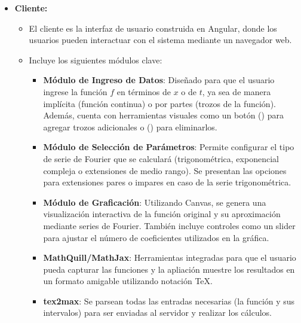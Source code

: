 \begin{itemize}
	\item \textbf{Cliente:}
	\begin{itemize}
		\item El cliente es la interfaz de usuario construida en Angular, donde los usuarios pueden interactuar con el sistema mediante un navegador web.
		\item Incluye los siguientes módulos clave:
		\begin{itemize}
			\item \textbf{Módulo de Ingreso de Datos}: Diseñado para que el usuario ingrese la función \( f \) en términos de $x$ o de $t$, ya sea de manera implícita (función continua) o por partes (trozos de la función). Además, cuenta con herramientas visuales como un botón () para agregar trozos adicionales o () para eliminarlos.
			\item \textbf{Módulo de Selección de Parámetros}: Permite configurar el tipo de serie de Fourier que se calculará (trigonométrica, exponencial compleja o extensiones de medio rango). Se presentan las opciones para extensiones pares o impares en caso de la serie trigonométrica.
			\item \textbf{Módulo de Graficación}: Utilizando Canvas, se genera una visualización interactiva de la función original y su aproximación mediante series de Fourier. También incluye controles como un slider para ajustar el número de coeficientes utilizados en la gráfica.
			\item \textbf{MathQuill/MathJax}: Herramientas integradas para que el usuario pueda capturar las funciones y la apliación muestre los resultados en un formato amigable utilizando notación TeX.
			\item \textbf{tex2max}: Se parsean todas las entradas necesarias (la función y sus intervalos) para ser enviadas al servidor y realizar los cálculos. 
		\end{itemize}
	\end{itemize}
	

\end{itemize}
